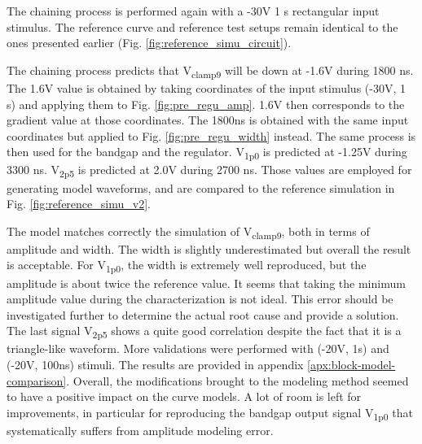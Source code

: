 The chaining process is performed again with a -30V 1 \textmu{}s rectangular input stimulus.
The reference curve and reference test setups remain identical to the ones presented earlier (Fig. \ref{fig:reference_simu_circuit}).

The chaining process predicts that V\textsubscript{clamp9} will be down at -1.6V during 1800 ns.
The 1.6V value is obtained by taking coordinates of the input stimulus (-30V, 1 \textmu{}s) and applying them to Fig. \ref{fig:pre_regu_amp}.
1.6V then corresponds to the gradient value at those coordinates.
The 1800ns is obtained with the same input coordinates but applied to Fig. \ref{fig:pre_regu_width} instead.
The same process is then used for the bandgap and the regulator.
V\textsubscript{1p0} is predicted at -1.25V during 3300 ns.
V\textsubscript{2p5} is predicted at 2.0V during 2700 ns.
Those values are employed for generating model waveforms, and are compared to the reference simulation in Fig. \ref{fig:reference_simu_v2}.

The model matches correctly the simulation of V\textsubscript{clamp9}, both in terms of amplitude and width.
The width is slightly underestimated but overall the result is acceptable.
For V\textsubscript{1p0}, the width is extremely well reproduced, but the amplitude is about twice the reference value.
It seems that taking the minimum amplitude value during the characterization is not ideal.
This error should be investigated further to determine the actual root cause and provide a solution.
The last signal V\textsubscript{2p5} shows a quite good correlation despite the fact that it is a triangle-like waveform.
More validations were performed with (-20V, 1\textmu{}s) and (-20V, 100ns) stimuli.
The results are provided in appendix \ref{apx:block-model-comparison}.
Overall, the modifications brought to the modeling method seemed to have a positive impact on the curve models.
A lot of room is left for improvements, in particular for reproducing the bandgap output signal V\textsubscript{1p0} that systematically suffers from amplitude modeling error.

